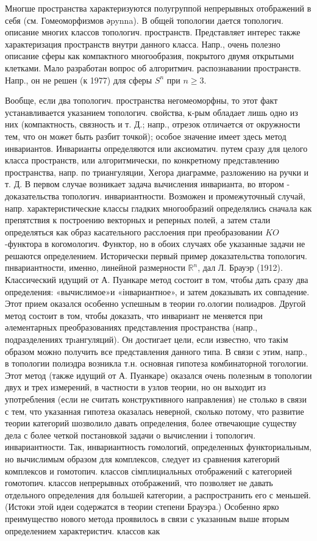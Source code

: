 \documentclass[10pt]{article}
\begin{document}
Многше пространства характеризуются полугруппой непрерывных отображений в себя (см. Гомеоморфизмов әpynna). В общей топологии дается топологич. описание многих классов топологич. пространств. Представляет интерес также характеризация пространств внутри данного класса. Напр., очень полезно описание сферы как компактного многообразия, покрытого двумя открытыми клетками. Мало разработан вопрос об алгоритмич. распознавании пространств. Напр., он не решен (к 1977) для сферы $S^{n}$ при $n \geqslant 3$.



Вообще, если два топологич. пространства негомеоморфны, то этот факт устанавливается указанием топологич. свойства, к-рым обладает лишь одно из них (компактность, связность и т. Д.; напр., отрезок отличается от окружности тем, что он может быть разбит точкой); особое значение имеет здесь метод инвариантов. Инварианты определяются или аксиоматич. путем сразу для целого класса пространств, или алгоритмически, по конкретному представлению пространства, напр. по триангуляции, Хегора диаграмме, разложению на ручки и т. Д. В первом случае возникает задача вычисления инварианта, во втором - доказательства топологич. инвариантности. Возможен и промежуточный случай, напр. характеристические классы гладких многообразий определялись сначала как препятствия к построению векторных и реперных полей, а затем стали определяться как образ касательного расслоения при преобразовании $K O$-функтора в когомологич. Функтор, но в обоих случаях обе указанные задачи не решаются определением. Исторически первый пример доказательства топологич. пнвариантности, именно, линейной размерности $\mathbb{R}^{n}$, дал Л. Брауэр (1912). Классический идущий от А. Пуанкаре метод состоит в том, чтобы дать сразу два определения: «вычислимое»и «інвариантное», и затем доказывать их совпадение. Этот прием оказался особенно успешным в теории го.ологии полиәдров. Другой метод состоит в том, чтобы доказать, что инвариант не меняется при әлементарных преобразованиях представления пространства (напр., подразделениях трıангуляций). Он достигает цели, если известно, что такім образом можно получить все представления данного типа. В связи с этим, напр., в топологии полиэдра возникла т.н. основная гипотеза комбинаторной тогологии. Этот метод (также идущий от А. Пуанкаре) оказался очень полезным в топологии двух и трех измерений, в частности в узлов теории, но он выходит из употребления (если не считать конструктивного направления) не столько в связи с тем, что указанная гипотеза оказалась неверной, сколько потому, что развитие теории категорий шозволило давать определения, более отвечающие существу дела с более четкой постановкой задачи о вычислении і топологич. инвариантности. Так, инвариантность гомологий, определенных функториальным, но вычислимым образом для комплексов, следует из сравнения категорий комплексов и гомотопич. классов сімплициальных отображений с категорией гомотопич. классов непрерывных отображений, что позволяет не давать отдельного определения для большей категории, а распространить его с меньшей. (Истоки этой идеи содержатся в теории степени Брауэра.) Особенно ярко преимущество нового метода проявилось в связи с указанным выше вторым определением характеристич. классов как 
\end{document}
